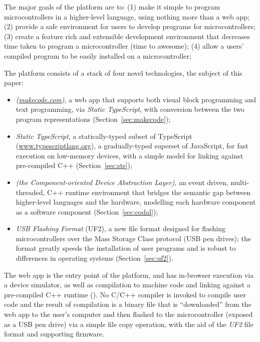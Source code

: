 The major goals of the platform are to:
(1) make it simple to program microcontrollers in a higher-level language,
using nothing more than a web app;
(2) provide a safe environment for users to develop programs for microcontrollers;
(3) create a feature rich and extensible development environment that decreases time taken to program a microcontroller (time to awesome);
(4) allow a users' compiled program to be easily installed on a microcontroller;


The platform consists of a stack of four novel technologies, the subject of
this paper:
\begin{itemize}
\item \emph{\MC (\href{https://makecode.com}{makecode.com})}, a web app that supports both visual block programming and text programming,
via \emph{Static TypeScript}, with conversion between the two program representations (Section~\ref{sec:makecode});

\item \emph{Static TypeScript}, a statically-typed subset of TypeScript (\url{www.typescriptlang.org}),
a gradually-typed superset of JavaScript, for fast execution on low-memory devices, with
a simple model for linking against pre-compiled C++ (Section~\ref{sec:sts});

\item \emph{\CO (the Component-oriented Device Abstraction Layer)}, an event driven, multi-threaded, C++ runtime environment that bridges the semantic gap between higher-level languages and the hardware,
modelling each hardware component as a software component (Section~\ref{sec:codal});

\item \emph{USB Flashing Format} (UF2), a new file format designed for flashing microcontrollers 
over the Mass Storage Class protocol (USB pen drives); the format greatly speeds the installation of user
programs and is robust to differences in operating systems (Section~\ref{sec:uf2}).
\end{itemize}
The \MC web app is the entry point of the platform, and has in-browser execution via a device simulator, as well as compilation to machine code and linking against a
pre-compiled C++ runtime (\emph{\CON}). No C/C++ compiler is invoked to compile user code and the result of compilation is a binary file that is ``downloaded'' from the web app to the user's
computer and then flashed to the microcontroller (exposed as a USB pen drive) 
via a simple file copy operation,  with the aid of the \emph{UF2} file format and supporting firmware. 


